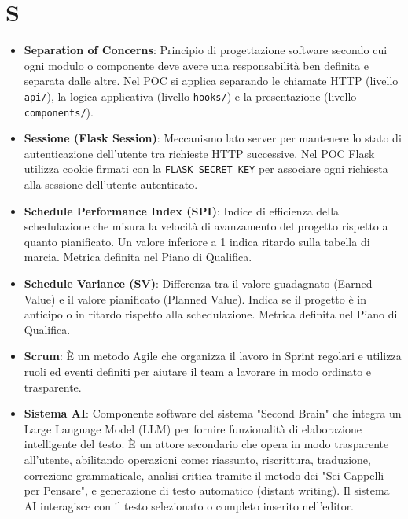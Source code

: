 \documentclass[11pt,a4paper]{article}
\begin{document}
\section*{S}
\begin{itemize}
\item \textbf{Separation of Concerns}: Principio di progettazione 
software secondo cui ogni modulo o componente deve avere una 
responsabilità ben definita e separata dalle altre. Nel POC 
si applica separando le chiamate HTTP (livello \texttt{api/}), 
la logica applicativa (livello \texttt{hooks/}) e la presentazione 
(livello \texttt{components/}).

\item \textbf{Sessione (Flask Session)}: Meccanismo lato server per 
mantenere lo stato di autenticazione dell'utente tra richieste 
HTTP successive. Nel POC Flask utilizza cookie firmati con la 
\texttt{FLASK\_SECRET\_KEY} per associare ogni richiesta alla 
sessione dell'utente autenticato.

\item \textbf{Schedule Performance Index (SPI)}: Indice di efficienza della schedulazione che misura la velocità di avanzamento del progetto rispetto a quanto pianificato. Un valore inferiore a 1 indica ritardo sulla tabella di marcia. Metrica definita nel Piano di Qualifica.

\item \textbf{Schedule Variance (SV)}: Differenza tra il valore guadagnato (Earned Value) e il valore pianificato (Planned Value). Indica se il progetto è in anticipo o in ritardo rispetto alla schedulazione. Metrica definita nel Piano di Qualifica.

\item \textbf{Scrum}: È un metodo Agile che organizza il lavoro in Sprint regolari e utilizza ruoli ed eventi definiti per aiutare il team a lavorare in modo ordinato e trasparente.

\item \textbf{Sistema AI}: Componente software del sistema "Second Brain" che integra un Large Language Model (LLM) per fornire funzionalità di elaborazione intelligente del testo. È un attore secondario che opera in modo trasparente all'utente, abilitando operazioni come: riassunto, riscrittura, traduzione, correzione grammaticale, analisi critica tramite il metodo dei "Sei Cappelli per Pensare", e generazione di testo automatico (distant writing). Il sistema AI interagisce con il testo selezionato o completo inserito nell'editor.


\end{itemize}
\end{document}
